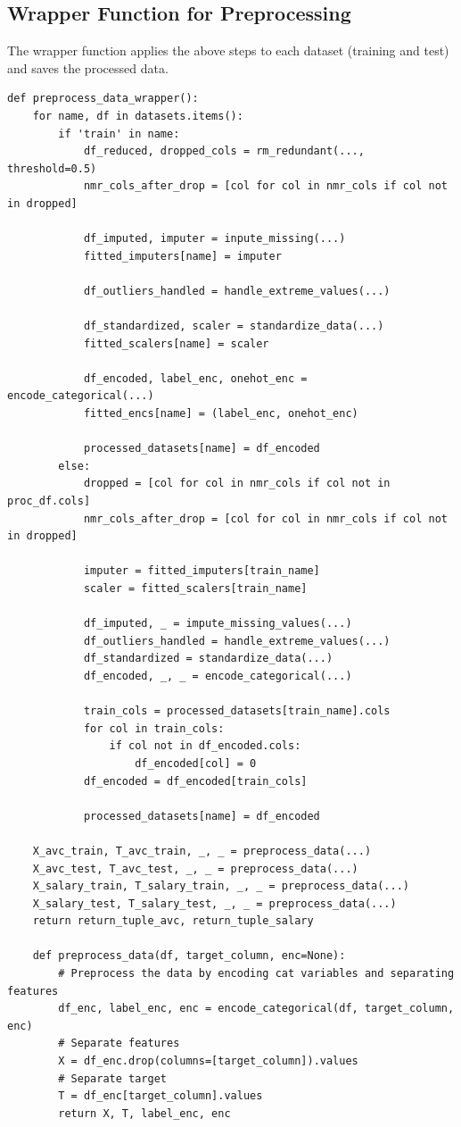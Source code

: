 \documentclass[a4paper,12pt]{article}
\begin{document}
\newpage
\subsection{Wrapper Function for Preprocessing}
The wrapper function applies the above steps to each dataset (training and test) and saves the processed data.

\begin{verbatim}
def preprocess_data_wrapper():
    for name, df in datasets.items():
        if 'train' in name:
            df_reduced, dropped_cols = rm_redundant(..., threshold=0.5)
            nmr_cols_after_drop = [col for col in nmr_cols if col not in dropped]

            df_imputed, imputer = inpute_missing(...)
            fitted_imputers[name] = imputer

            df_outliers_handled = handle_extreme_values(...)

            df_standardized, scaler = standardize_data(...)
            fitted_scalers[name] = scaler

            df_encoded, label_enc, onehot_enc = encode_categorical(...)
            fitted_encs[name] = (label_enc, onehot_enc)

            processed_datasets[name] = df_encoded
        else:
            dropped = [col for col in nmr_cols if col not in proc_df.cols]
            nmr_cols_after_drop = [col for col in nmr_cols if col not in dropped]

            imputer = fitted_imputers[train_name]
            scaler = fitted_scalers[train_name]

            df_imputed, _ = impute_missing_values(...)
            df_outliers_handled = handle_extreme_values(...)
            df_standardized = standardize_data(...)
            df_encoded, _, _ = encode_categorical(...)

            train_cols = processed_datasets[train_name].cols
            for col in train_cols:
                if col not in df_encoded.cols:
                    df_encoded[col] = 0
            df_encoded = df_encoded[train_cols]

            processed_datasets[name] = df_encoded

    X_avc_train, T_avc_train, _, _ = preprocess_data(...)
    X_avc_test, T_avc_test, _, _ = preprocess_data(...)
    X_salary_train, T_salary_train, _, _ = preprocess_data(...)
    X_salary_test, T_salary_test, _, _ = preprocess_data(...)
    return return_tuple_avc, return_tuple_salary

    def preprocess_data(df, target_column, enc=None):
        # Preprocess the data by encoding cat variables and separating features
        df_enc, label_enc, enc = encode_categorical(df, target_column, enc)
        # Separate features
        X = df_enc.drop(columns=[target_column]).values
        # Separate target
        T = df_enc[target_column].values
        return X, T, label_enc, enc
\end{verbatim}
\end{document}
